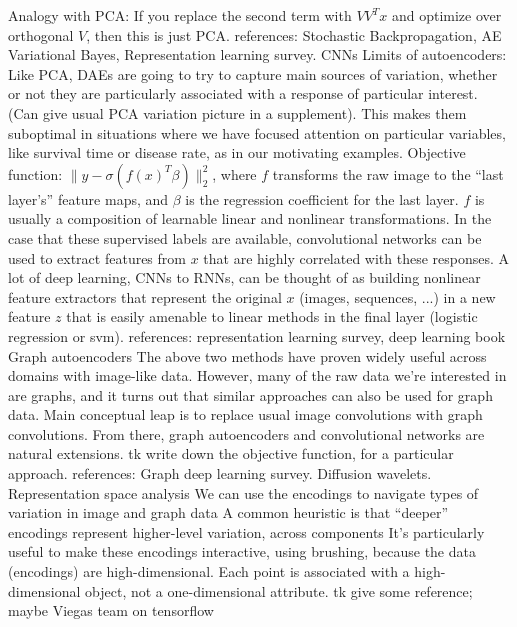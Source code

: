 \documentclass[11pt]{article}
\begin{document}
\begin{outline}
    \3 Analogy with PCA: If you replace the second term with $VV^{T}x$ and
    optimize over orthogonal $V$, then this is just PCA.
    \3 references: Stochastic Backpropagation, AE Variational Bayes,
    Representation learning survey.
  \2 CNNs
    \3 Limits of autoencoders: Like PCA, DAEs are going to try to capture main
    sources of variation, whether or not they are particularly associated with a
    response of particular interest. (Can give usual PCA variation picture in a
    supplement). This makes them suboptimal in situations where we have focused
    attention on particular variables, like survival time or disease rate, as in
    our motivating examples.
    \3 Objective function: $\|y -
    \sigma\left(f\left(x\right)^{T}\beta\right)\|_{2}^{2}$, where $f$ transforms
    the raw image to the ``last layer's'' feature maps, and $\beta$ is the
    regression coefficient for the last layer. $f$ is usually a composition of
    learnable linear and nonlinear transformations.
    \3 In the case that these supervised labels are available, convolutional
    networks can be used to extract features from $x$ that are highly correlated
    with these responses. A lot of deep learning, CNNs to RNNs, can be thought
    of as building nonlinear feature extractors that represent the original $x$
    (images, sequences, ...) in a new feature $z$ that is easily amenable to
    linear methods in the final layer (logistic regression or svm).
    \3 references: representation learning survey, deep learning book
  \2 Graph autoencoders
    \3 The above two methods have proven widely useful across domains with
    image-like data. However, many of the raw data we're interested in are
    graphs, and it turns out that similar approaches can also be used for graph
    data.
    \3 Main conceptual leap is to replace usual image convolutions with graph
    convolutions. From there, graph autoencoders and convolutional networks are
    natural extensions.
    \3 tk write down the objective function, for a particular approach.
    \3 references: Graph deep learning survey. Diffusion wavelets.
  \2 Representation space analysis
    \3 We can use the encodings to navigate types of variation in image and
    graph data
    \3 A common heuristic is that ``deeper'' encodings represent higher-level
    variation, across components
    \3 It's particularly useful to make these encodings interactive, using
    brushing, because the data (encodings) are high-dimensional. Each point is
    associated with a high-dimensional object, not a one-dimensional attribute.
    \3 tk give some reference; maybe Viegas team on tensorflow


\end{outline}
\end{document}
